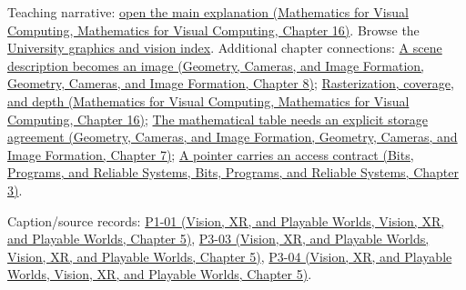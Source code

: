 Teaching narrative: \href{../02-Mathematics-for-Visual-Computing/main.pdf\#nameddest=03-visual-computing-i-ch012-rasterization-coverage-and-depth}{open the main explanation (Mathematics for Visual Computing, Mathematics for Visual Computing, Chapter 16)}. Browse the \hyperref[appendix-a6d556a4ef50-university-graphics-vision-and-photography---independent-series]{University graphics and vision index}. Additional chapter connections: \href{../03-Geometry-Cameras-and-Image-Formation/main.pdf\#nameddest=03-visual-computing-i-ch001-a-scene-description-becomes-an-image}{A scene description becomes an image (Geometry, Cameras, and Image Formation, Geometry, Cameras, and Image Formation, Chapter 8)}; \href{../02-Mathematics-for-Visual-Computing/main.pdf\#nameddest=03-visual-computing-i-ch012-rasterization-coverage-and-depth}{Rasterization, coverage, and depth (Mathematics for Visual Computing, Mathematics for Visual Computing, Chapter 16)}; \href{../03-Geometry-Cameras-and-Image-Formation/main.pdf\#nameddest=02-foundations-ii-ch038-the-mathematical-table-needs-an-explicit-storage-agreement}{The mathematical table needs an explicit storage agreement (Geometry, Cameras, and Image Formation, Geometry, Cameras, and Image Formation, Chapter 7)}; \href{../01-Bits-Programs-and-Reliable-Systems/main.pdf\#nameddest=01-foundations-i-ch003-a-pointer-carries-an-access-contract}{A pointer carries an access contract (Bits, Programs, and Reliable Systems, Bits, Programs, and Reliable Systems, Chapter 3)}.

Caption/source records: \href{../07-Vision-XR-and-Playable-Worlds/main.pdf\#nameddest=04-visual-computing-ii-ch036-p1-01---module-1.1-course-intro-administrivia-part-1-graphics-visual-computing-2026}{P1-01 (Vision, XR, and Playable Worlds, Vision, XR, and Playable Worlds, Chapter 5)}, \href{../07-Vision-XR-and-Playable-Worlds/main.pdf\#nameddest=04-visual-computing-ii-ch036-p3-03---moving-objects-in-space}{P3-03 (Vision, XR, and Playable Worlds, Vision, XR, and Playable Worlds, Chapter 5)}, \href{../07-Vision-XR-and-Playable-Worlds/main.pdf\#nameddest=04-visual-computing-ii-ch036-p3-04---rotations-about-an-arbitrary-axis}{P3-04 (Vision, XR, and Playable Worlds, Vision, XR, and Playable Worlds, Chapter 5)}.
